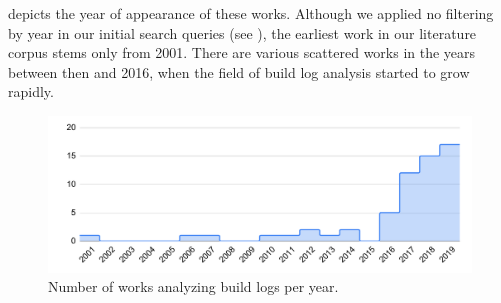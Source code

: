  depicts the year of appearance of these works. Although we applied no filtering by year in our initial search queries (see ), the earliest work in our literature corpus stems only from 2001. There are various scattered works in the years between then and 2016, when the field of build log analysis started to grow rapidly.

\begin{figure}[tbp]
		\centering
		\includegraphics[width=\columnwidth,
		clip]{img/lit-sur/years.pdf}
		\caption{Number of works analyzing build logs per year.}
		\label{fig:failure-reason-PBE}
\end{figure}



